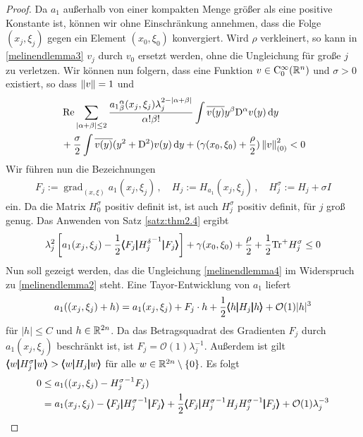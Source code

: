 \begin{proof}
Da $a_1$ außerhalb von einer kompakten Menge größer als eine positive Konstante ist, können wir ohne Einschränkung annehmen, dass die Folge $(x_j,\xi_j)$ gegen ein Element $(x_0,\xi_0)$ konvergiert.
Wird $\rho$ verkleinert, so kann in \eqref{melinendlemma3} $v_j$ durch $v_0$ ersetzt werden, ohne die Ungleichung für große $j$ zu verletzen.
Wir können nun folgern, dass eine Funktion $v\in\mathrm C^\infty_0(\mathbb R^n)$ und $\sigma>0$ existiert, so dass $\left\lVert v\right\rVert =1$ und
\begin{align*}
&\operatorname{Re} \sum_{|\alpha+\beta|\le 2} \frac{{a_1}^\alpha_\beta(x_j,\xi_j)\lambda_j^{2-|\alpha+\beta|}}{\alpha!\beta!}\int\overline{v(y)}y^\beta\mathrm D^\alpha v(y)\,\mathrm d y\\
& + \frac \sigma 2 \int \overline{v(y)}(y^2 + \mathrm D^2)v(y) \,\mathrm d y+ (\gamma(x_0,\xi_0)+ \frac\rho 2)\left\lVert v\right\rVert _{(0)}^2 < 0
\end{align*}
Wir führen nun die Bezeichnungen
\begin{align*}
F_j := \operatorname{grad}_{(x,\xi)}a_1(x_j,\xi_j)\,,\quad H_j:=H_{a_1}(x_j,\xi_j)\,,\quad H_j^\sigma:=H_j  + \sigma I
\end{align*}
ein. Da die Matrix $H_0^\sigma$ positiv definit ist, ist auch $H_j^\sigma$ positiv definit, für $j$ groß genug. Das Anwenden von Satz \ref{satz:thm2.4} ergibt
\begin{align}\label{melinendlemma4}
\lambda_j^2\left[ a_1(x_j,\xi_j) - \frac{1}{2}\pmb\langle F_j\pmb|{H_j^\delta}^{-1}\pmb|F_j\pmb\rangle \right] + \gamma(x_0,\xi_0) + \frac \rho 2 + \frac 1 2 \mathrm{Tr}^+ H_j^\sigma\le 0
\end{align}
Nun soll gezeigt werden, das die Ungleichung \eqref{melinendlemma4} im Widerspruch zu \eqref{melinendlemma2} steht. Eine Tayor-Entwicklung von $a_1$ liefert
\begin{align*}
a_1((x_j,\xi_j) + h ) = a_1(x_j,\xi_j) + F_j\cdot h + \frac 1 2 \pmb\langle h\pmb|H_j\pmb|h\pmb\rangle + \mathcal O(1)|h|^3
\end{align*}
für $|h|\le C$ und $h\in\mathbb R^{2n}$. Da das Betragsquadrat des Gradienten $F_j$ durch $a_1(x_j,\xi_j)$ beschränkt ist, ist $F_j=\mathcal O(1)\lambda_j^{-1}$. Außerdem ist gilt $\pmb\langle w\pmb|H_j^\sigma\pmb|w\pmb\rangle>\pmb\langle w\pmb|H_j\pmb|w\pmb\rangle$ für alle $w\in\mathbb R^{2n}\setminus\{0\}$. Es folgt
\begin{align*}
0&\le a_1((x_j,\xi_j)- {H_j^\sigma}^{-1}F_j) \\&= a_1(x_j,\xi_j) - \cspro{F_j}{{H_j^\sigma}^{-1}}{F_j} + \frac 1 2\cspro{F_j}{{H_j^\sigma}^{-1}H_j{H_j^\sigma}^{-1}}{F_j} + \mathcal O(1)\lambda_j^{-3}\\

\end{align*}
\end{proof}
